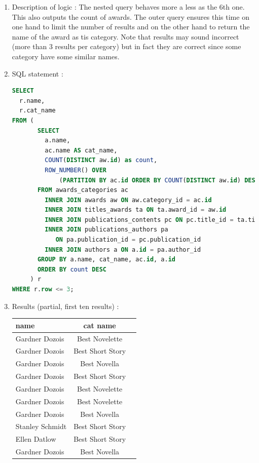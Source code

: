 \documentclass[doubleside, titlepage]{article}
\begin{document}
	\begin{enumerate}
	\item Description of logic : The nested query behaves more a less as the 6th one. This also outputs the count of awards. The outer query ensures this time on one hand to limit the number of results and on the other hand to return the name of the award as tis category. Note that results may sound incorrect (more than 3 results per category) but in fact they are correct since some category have some similar names.
	\item SQL statement :
		\begin{lstlisting}[language=SQL,showspaces=false,basicstyle=\ttfamily,numberstyle=\tiny,commentstyle=\color{gray}]
SELECT
  r.name,
  r.cat_name
FROM (
       SELECT
         a.name,
         ac.name AS cat_name,
         COUNT(DISTINCT aw.id) as count,
         ROW_NUMBER() OVER 
             (PARTITION BY ac.id ORDER BY COUNT(DISTINCT aw.id) DESC) AS row
       FROM awards_categories ac
         INNER JOIN awards aw ON aw.category_id = ac.id
         INNER JOIN titles_awards ta ON ta.award_id = aw.id
         INNER JOIN publications_contents pc ON pc.title_id = ta.title_id
         INNER JOIN publications_authors pa 
         	ON pa.publication_id = pc.publication_id
         INNER JOIN authors a ON a.id = pa.author_id
       GROUP BY a.name, cat_name, ac.id, a.id
       ORDER BY count DESC
     ) r
WHERE r.row <= 3;
		\end{lstlisting}

	\item Results (partial, first ten results) :\\

	\begin{tabular}{|l|c|r|}
	  \hline
		name & cat name \\
	  \hline
Gardner Dozois	& Best Novelette\\
Gardner Dozois	& Best Short Story\\
Gardner Dozois	& Best Novella\\
Gardner Dozois	& Best Short Story\\
Gardner Dozois	& Best Novelette\\
Gardner Dozois	& Best Novelette\\
Gardner Dozois	& Best Novella\\
Stanley Schmidt	& Best Short Story\\
Ellen Datlow	& Best Short Story\\
Gardner Dozois	& Best Novella\\
	  \hline
	\end{tabular}
\end{enumerate}
\end{document}
